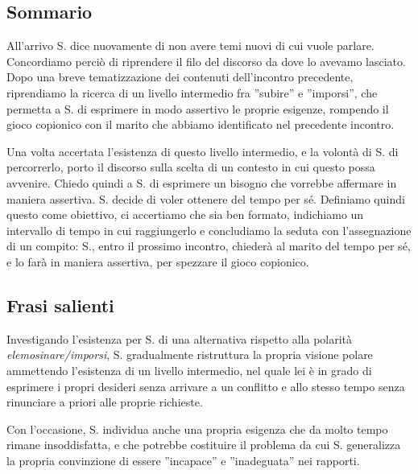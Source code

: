 \subsection*{Sommario}

All'arrivo S. dice nuovamente di non avere temi nuovi di cui vuole parlare. Concordiamo perciò di riprendere il filo del discorso da dove lo avevamo lasciato. Dopo una breve tematizzazione dei contenuti dell'incontro precedente, riprendiamo la ricerca di un livello intermedio fra ''subire'' e ''imporsi'', che permetta a S. di esprimere in modo assertivo le proprie esigenze, rompendo il gioco copionico con il marito che abbiamo identificato nel precedente incontro.

Una volta accertata l'esistenza di questo livello intermedio, e la volontà di S. di percorrerlo, porto il discorso sulla scelta di un contesto in cui questo possa avvenire. Chiedo quindi a S. di esprimere un bisogno che vorrebbe affermare in maniera assertiva. S. decide di voler ottenere del tempo per sé. Definiamo quindi questo come obiettivo, ci accertiamo che sia ben formato, indichiamo un intervallo di tempo in cui raggiungerlo e concludiamo la seduta con l'assegnazione di un compito: S., entro il prossimo incontro, chiederà al marito del tempo per sé, e lo farà in maniera assertiva, per spezzare il gioco copionico.


\subsection*{Frasi salienti}

Investigando l'esistenza per S. di una alternativa rispetto alla  polarità \emph{elemosinare/imporsi}, S. gradualmente ristruttura la propria visione polare ammettendo l'esistenza di un livello intermedio, nel quale lei è in grado di esprimere i propri desideri senza arrivare a un conflitto e allo stesso tempo senza rinunciare a priori alle proprie richieste. 

Con l'occasione, S. individua anche una propria esigenza che da molto tempo rimane insoddisfatta, e che potrebbe costituire il problema da cui S. generalizza la propria convinzione di essere ''incapace'' e ''inadeguata'' nei rapporti.

